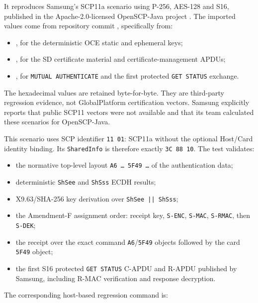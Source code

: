 It reproduces Samsung's SCP11a scenario using P-256, AES-128 and S16,
published in the Apache-2.0-licensed OpenSCP-Java project
\cite{samsung-openscp-java,samsung-openscp-blog}. The imported values come
from repository commit
, specifically from:

\begin{itemize}
\item {}, for the deterministic OCE static and
      ephemeral keys;
\item {}, for the SD certificate material and
      certificate-management APDUs;
\item {}, for
      \texttt{MUTUAL AUTHENTICATE} and the first protected
      \texttt{GET STATUS} exchange.
\end{itemize}

The hexadecimal values are retained byte-for-byte. They are third-party
regression evidence, not GlobalPlatform certification vectors. Samsung
explicitly reports that public SCP11 vectors were not available and that its
team calculated these scenarios for OpenSCP-Java.

This scenario uses SCP identifier \texttt{11 01}: SCP11a without the optional
Host/Card identity binding. Its \texttt{SharedInfo} is therefore exactly
\texttt{3C 88 10}. The test validates:

\begin{itemize}
\item the normative top-level layout
      \texttt{A6 \ldots{} 5F49 \ldots{}} of the authentication data;
\item deterministic \texttt{ShSee} and \texttt{ShSss} ECDH results;
\item X9.63/SHA-256 key derivation over \texttt{ShSee || ShSss};
\item the Amendment-F assignment order: receipt key, \texttt{S-ENC},
      \texttt{S-MAC}, \texttt{S-RMAC}, then \texttt{S-DEK};
\item the receipt over the exact command \texttt{A6}/\texttt{5F49} objects
      followed by the card \texttt{5F49} object;
\item the first S16 protected \texttt{GET STATUS} C-APDU and R-APDU published
      by Samsung, including R-MAC verification and response decryption.
\end{itemize}

The corresponding host-based regression command is:

